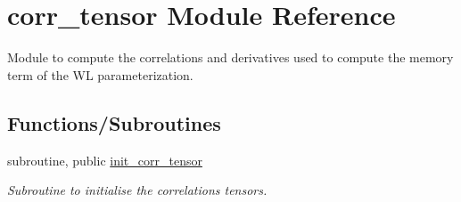 \hypertarget{namespacecorr__tensor}{}\section{corr\+\_\+tensor Module Reference}
\label{namespacecorr__tensor}


Module to compute the correlations and derivatives used to compute the memory term of the WL parameterization.  


\subsection*{Functions/\+Subroutines}
\begin{DoxyCompactItemize}
\item 
subroutine, public \hyperlink{namespacecorr__tensor_a95d9ad1c3ae4a30e2eead85010be9d5d}{init\+\_\+corr\+\_\+tensor}
\begin{DoxyCompactList}\small\item\em Subroutine to initialise the correlations tensors. \end{DoxyCompactList}\end{DoxyCompactItemize}
